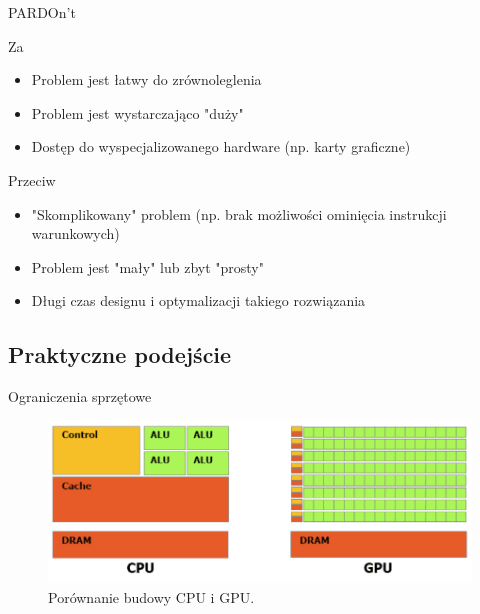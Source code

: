 \documentclass{if-beamer}
\begin{document}
\usebackgroundtemplate{} 
\begin{frame}{PARDOn't}

\begin{block}{Za}
\begin{itemize}
  \item Problem jest łatwy do zrównoleglenia
  \item Problem jest wystarczająco "duży"
  \item Dostęp do wyspecjalizowanego hardware (np. karty graficzne)
\end{itemize}
\end{block}

\begin{alertblock}{Przeciw}
\begin{itemize}
  \item "Skomplikowany" problem (np. brak możliwości ominięcia instrukcji warunkowych)
  \item Problem jest "mały" lub zbyt "prosty"
  \item Długi czas designu i optymalizacji takiego rozwiązania
\end{itemize}
\end{alertblock}
\end{frame}

\subsection{Praktyczne podejście}

\begin{frame}{Ograniczenia sprzętowe}

\begin{figure}
\centering
\includegraphics[scale=0.65]{cpuvsgpu.png}
\caption{Porównanie budowy CPU i GPU.}
\end{figure}

\end{frame}
\end{document}
